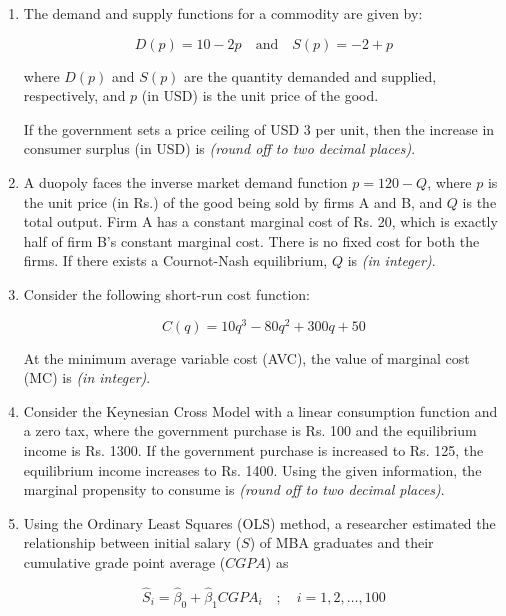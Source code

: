 \documentclass[journal,13pt,onecolumn]{exam}
\theoremstyle{remark}
\begin{document}
\begin{enumerate}[label=Q.\arabic*]
\item The demand and supply functions for a commodity are given by:

\[
D(p) = 10 - 2p \quad \text{and} \quad S(p) = -2 + p
\]

where \( D(p) \) and \( S(p) \) are the quantity demanded and supplied, respectively, and \( p \) (in USD) is the unit price of the good.

If the government sets a price ceiling of USD 3 per unit, then the increase in consumer surplus (in USD) is \underline{\hspace{1cm}} \textit{(round off to two decimal places)}.

\item A duopoly faces the inverse market demand function \( p = 120 - Q \), where \( p \) is the unit price (in Rs.) of the good being sold by firms A and B, and \( Q \) is the total output. Firm A has a constant marginal cost of Rs. 20, which is exactly half of firm B's constant marginal cost. There is no fixed cost for both the firms. If there exists a Cournot-Nash equilibrium, \( Q \) is \underline{\hspace{1cm}} \textit{(in integer)}.

\item Consider the following short-run cost function:

\[
C(q) = 10q^3 - 80q^2 + 300q + 50
\]

At the minimum average variable cost (AVC), the value of marginal cost (MC) is \underline{\hspace{1cm}} \textit{(in integer)}.

\item Consider the Keynesian Cross Model with a linear consumption function and a zero tax, where the government purchase is Rs. 100 and the equilibrium income is Rs. 1300. If the government purchase is increased to Rs. 125, the equilibrium income increases to Rs. 1400. Using the given information, the marginal propensity to consume is \underline{\hspace{1cm}} \textit{(round off to two decimal places)}.

\item Using the Ordinary Least Squares (OLS) method, a researcher estimated the relationship between initial salary (\(S\)) of MBA graduates and their cumulative grade point average (\(CGPA\)) as

\[
\hat{S}_i = \hat{\beta}_0 + \hat{\beta}_1 CGPA_i \quad ; \quad i = 1,2, \ldots, 100
\]


\end{enumerate}
\end{document}
